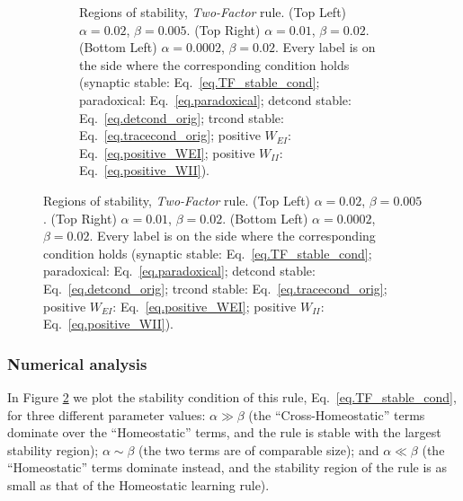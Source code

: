 \documentclass[
twocolumn,
]{article}
\newcommand{\EE}{\mathit{EE}}
\newcommand{\EI}{\mathit{EI}}
\newcommand{\IE}{\mathit{IE}}
\newcommand{\II}{\mathit{II}}
\newcommand{\set}{\mathit{set}}
\begin{document}
\begin{figure}[!ht]
{\begin{figure}[H]
\caption{Regions of stability, {\em Two-Factor} rule. (Top Left) $\alpha=0.02$, $\beta=0.005$. (Top Right) $\alpha=0.01$, $\beta=0.02$. (Bottom Left) $\alpha=0.0002$, $\beta=0.02$. Every label is on the side where the  corresponding  condition  holds (synaptic stable: Eq.\ \ref{eq.TF_stable_cond}; paradoxical: Eq.\ \ref{eq.paradoxical}; detcond stable: Eq.\ \ref{eq.detcond_orig}; trcond stable: Eq.\ \ref{eq.tracecond_orig}; positive $W_{\EI}$: Eq.\ \ref{eq.positive_WEI}; positive $W_{\II}$: Eq.\ \ref{eq.positive_WII}).}
\label{fig.TF_stability}
\end{figure}}
\end{figure}


\subsubsection{Numerical analysis}

In Figure \ref{fig.TF_stability} we plot the stability condition of this rule, Eq.\ \ref{eq.TF_stable_cond}, for three different parameter values: $\alpha \gg \beta$ (the ``Cross-Homeostatic'' terms dominate over the ``Homeostatic'' terms, and the rule is stable with the largest stability region); $\alpha \sim \beta$ (the two terms are of comparable size); and $\alpha \ll \beta$ (the ``Homeostatic'' terms dominate instead, and the stability region of the rule is as small as that of the Homeostatic learning rule).







\end{document}
